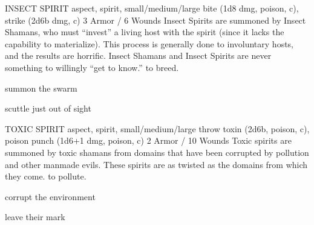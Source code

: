 \documentclass[oneside,10pt]{article}
\begin{document}
\begin{multicols}{2}
\critterspec
{INSECT SPIRIT	}
{aspect, spirit, small/medium/large}
{bite (1d8 dmg, poison, c), strike (2d6b dmg, c)}
{3 Armor / 6 Wounds}
{Insect Spirits are summoned by Insect Shamans, who must “invest” a living host with the spirit (since it lacks the capability to materialize). This process is generally done to involuntary hosts, and the results are horrific. Insect Shamans and Insect Spirits are never something to willingly “get to know.”}
{to breed.}
{\tcirc{} summon the swarm

\tcirc{} scuttle just out of sight}

\critterspec
{TOXIC SPIRIT	}
{aspect, spirit, small/medium/large}
{throw toxin (2d6b, poison, c), poison punch (1d6+1 dmg, poison, c)}
{2 Armor / 10 Wounds}
{Toxic spirits are summoned by toxic shamans from domains that have been corrupted by pollution and other manmade evils. These spirits are as twisted as the domains from which they come.}
{to pollute.}
{\tcirc{} corrupt the environment

\tcirc{} leave their mark}


\end{multicols}

\newpage

\end{document}
